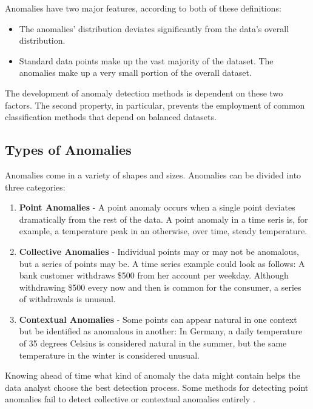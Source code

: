 Anomalies have two major features, according to both of these definitions:

\begin{itemize}
	\item The anomalies' distribution deviates significantly from the data's overall distribution.
	\item Standard data points make up the vast majority of the dataset. The anomalies make up a very small portion of the overall dataset.
\end{itemize}

The development of anomaly detection methods is dependent on these two factors. The second property, in particular, prevents the employment of common classification methods that depend on balanced datasets.

\subsection{Types of Anomalies}
Anomalies come in a variety of shapes and sizes. Anomalies can be divided into three categories:

\begin{enumerate}
	\item \textbf{Point Anomalies} - A point anomaly occurs when a single point deviates dramatically from the rest of the data.
	A point anomaly in a time seris is, for example, a temperature peak in an otherwise, over time, steady temperature.
	\item \textbf{Collective Anomalies} - Individual points may or may not be anomalous, but a series of points may be. A time series example could look as follows: A bank customer withdraws \$500 from her account per weekday. Although withdrawing \$500 every now and then is common for the consumer, a series of withdrawals is unusual.
	\item \textbf{Contextual Anomalies} - Some points can appear natural in one context but be identified as anomalous in another: In Germany, a daily temperature of 35 degrees Celsius is considered natural in the summer, but the same temperature in the winter is considered unusual.
\end{enumerate}

Knowing ahead of time what kind of anomaly the data might contain helps the data analyst choose the best detection process. Some methods for detecting point anomalies fail to detect collective or contextual anomalies entirely \parencite{Braei2020}. 

